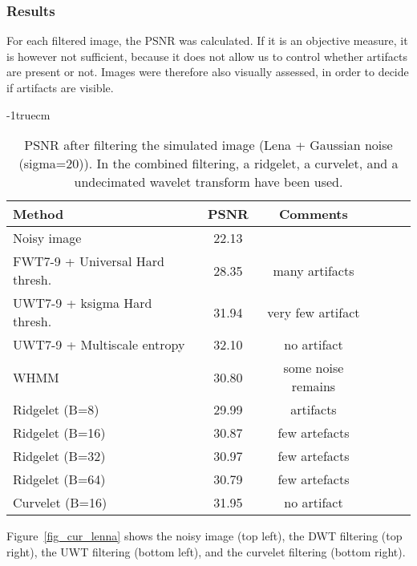 \documentclass{article}
\begin{document}
\subsubsection{Results}

For each filtered image, the PSNR was calculated. If it is an objective
measure, it is however not sufficient, because it does not allow us to 
control whether artifacts are present or not. Images were therefore also
visually assessed,  in order to decide if artifacts are visible.

\voffset -1truecm
{\small
\begin{table}[htb]

\begin{center}
\begin{tabular}{lccccc} \hline \hline
Method                          & PSNR   &  Comments   \\ \hline \hline
Noisy image                     & 22.13  &     \\
FWT7-9 + Universal Hard thresh. & 28.35  &    many artifacts    \\
UWT7-9 + ksigma  Hard thresh.   & 31.94  &    very few artifact \\
UWT7-9 + Multiscale entropy     & 32.10  &    no artifact       \\
WHMM                            & 30.80  &    some noise remains \\
Ridgelet (B=8)                  & 29.99  &    artifacts   \\
Ridgelet (B=16)                 & 30.87  &    few artefacts  \\
Ridgelet (B=32)                 & 30.97  &    few artefacts  \\
Ridgelet (B=64)                 & 30.79  &    few artefacts  \\
Curvelet (B=16)                 & 31.95  &    no artifact  \\ \hline \hline
\end{tabular}
\caption{PSNR after filtering the simulated image (Lena + Gaussian noise (sigma=20)).
In the combined filtering, a ridgelet, a curvelet, and a undecimated wavelet
transform have been used.}
\vspace{0.5cm}
\label{comptab1}
\end{center}
\end{table}
}
Figure~\ref{fig_cur_lenna} shows the noisy image (top left), the 
DWT filtering (top right), the UWT filtering  (bottom left), 
and the curvelet filtering (bottom  right).
\end{document}
